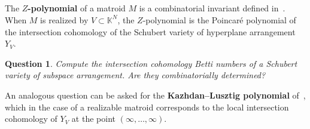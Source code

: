 \documentclass[11pt]{article}
\newtheorem{ques}[theo]{Question}
\theoremstyle{definition}
\numberwithin{equation}{section}
\newcommand{\K}{\mathbb{K}}
\newcommand{\word}[1]{\textbf{#1}}
\begin{document}
\subsection{}
The \word{$Z$-polynomial} of a matroid $M$ is a combinatorial invariant defined in~\cite{Zpoly}.
When $M$ is realized by $V \subset \K^N$, the $Z$-polynomial is the Poincar\'e polynomial of the intersection cohomology of the Schubert variety of hyperplane arrangement $Y_V$.
\begin{ques}
  Compute the intersection cohomology Betti numbers of a Schubert variety of subspace arrangement.
  Are they combinatorially determined?
\end{ques}
An analogous question can be asked for the \word{Kazhdan--Lusztig polynomial} of~\cite{KLpoly}, which in the case of a realizable matroid corresponds to the local intersection cohomology of $Y_V$ at the point $(\infty, \ldots, \infty)$.
\end{document}
